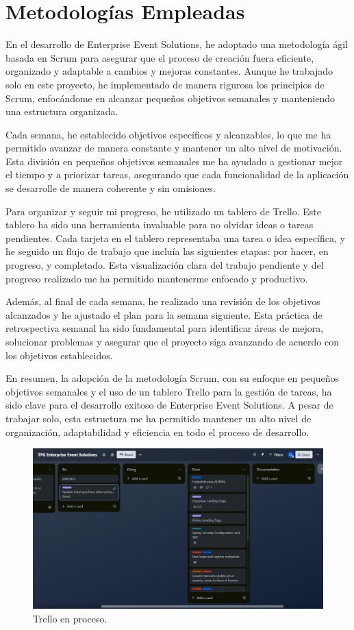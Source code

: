 \section{Metodologías Empleadas}

En el desarrollo de Enterprise Event Solutions, he adoptado una metodología ágil basada en Scrum para asegurar que el proceso de creación 
fuera eficiente, organizado y adaptable a cambios y mejoras constantes. Aunque he trabajado solo en este proyecto, he implementado de manera 
rigurosa los principios de Scrum, enfocándome en alcanzar pequeños objetivos semanales y manteniendo una estructura organizada.

Cada semana, he establecido objetivos específicos y alcanzables, lo que me ha permitido avanzar de manera constante y mantener un alto nivel 
de motivación. Esta división en pequeños objetivos semanales me ha ayudado a gestionar mejor el tiempo y a priorizar tareas, asegurando que cada 
funcionalidad de la aplicación se desarrolle de manera coherente y sin omisiones.

Para organizar y seguir mi progreso, he utilizado un tablero de Trello. Este tablero ha sido una herramienta invaluable para no olvidar ideas o 
tareas pendientes. Cada tarjeta en el tablero representaba una tarea o idea específica, y he seguido un flujo de trabajo que incluía las siguientes 
etapas: por hacer, en progreso, y completado. Esta visualización clara del trabajo pendiente y del progreso realizado me ha permitido mantenerme 
enfocado y productivo.

Además, al final de cada semana, he realizado una revisión de los objetivos alcanzados y he ajustado el plan para la semana siguiente. Esta práctica 
de retrospectiva semanal ha sido fundamental para identificar áreas de mejora, solucionar problemas y asegurar que el proyecto siga avanzando de acuerdo 
con los objetivos establecidos.

En resumen, la adopción de la metodología Scrum, con su enfoque en pequeños objetivos semanales y el uso de un tablero Trello para la gestión de 
tareas, ha sido clave para el desarrollo exitoso de Enterprise Event Solutions. A pesar de trabajar solo, esta estructura me ha permitido mantener 
un alto nivel de organización, adaptabilidad y eficiencia en todo el proceso de desarrollo.
\newpage

\begin{figure}[h]
    \includegraphics[width=\linewidth]{Trello.png}
    \caption{Trello en proceso.}
    \label{fig:metodologias1}
\end{figure}

